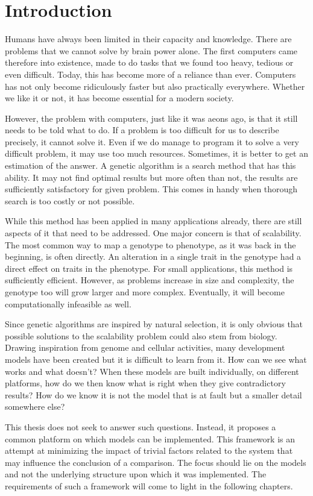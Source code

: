 \section{Introduction}
Humans have always been limited in their capacity and knowledge. There are problems that we cannot solve by brain power alone. The first computers came therefore into existence, made to do tasks that we found too heavy, tedious or even difficult. Today, this has become more of a reliance than ever. Computers has not only become ridiculously faster but also practically everywhere. Whether we like it or not, it has become essential for a modern society.

However, the problem with computers, just like it was aeons ago, is that it still needs to be told what to do. If a problem is too difficult for us to describe precisely, it cannot solve it. Even if we do manage to program it to solve a very difficult problem, it may use too much resources. Sometimes, it is better to get an estimation of the answer. A genetic algorithm is a search method that has this ability. It may not find optimal results but more often than not, the results are sufficiently satisfactory for given problem. This comes in handy when thorough search is too costly or not possible.

While this method has been applied in many applications already, there are still aspects of it that need to be addressed. One major concern is that of scalability. The most common way to map a genotype to phenotype, as it was back in the beginning, is often directly. An alteration in a single trait in the genotype had a direct effect on traits in the phenotype. For small applications, this method is sufficiently efficient. However, as problems increase in size and complexity, the genotype too will grow larger and more complex. Eventually, it will become computationally infeasible as well.

Since genetic algorithms are inspired by natural selection, it is only obvious that possible solutions to the scalability problem could also stem from biology. Drawing inspiration from genome and cellular activities, many development models have been created but it is difficult to learn from it. How can we see what works and what doesn't? When these models are built individually, on different platforms, how do we then know what is right when they give contradictory results? How do we know it is not the model that is at fault but a smaller detail somewhere else?

This thesis does not seek to answer such questions. Instead, it proposes a common platform on which models can be implemented. This framework is an attempt at minimizing the impact of trivial factors related to the system that may influence the conclusion of a comparison. The focus should lie on the models and not the underlying structure upon which it was implemented. The requirements of such a framework will come to light in the following chapters.

